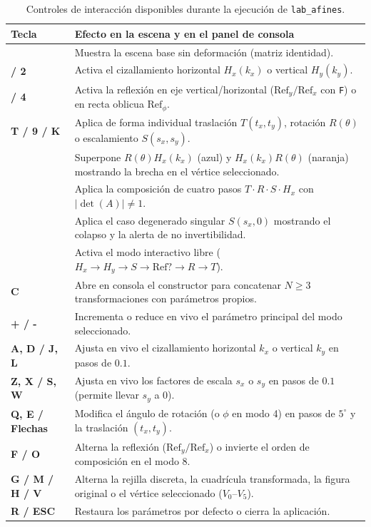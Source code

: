 \documentclass[a4paper,10pt]{article}
\begin{document}
\begin{table}[H]
\caption{Controles de interacción disponibles durante la ejecución de \texttt{lab\_afines}.}
\label{tab:controles}
\centering
\small
\renewcommand{\arraystretch}{1.15}
\begin{tabularx}{\textwidth}{>{\bfseries\ttfamily}p{2.6cm} X}
\toprule
Tecla & Efecto en la escena y en el panel de consola \\
\midrule
0 & Muestra la escena base sin deformación (matriz identidad). \\
1 / 2 & Activa el cizallamiento horizontal $H_x(k_x)$ o vertical $H_y(k_y)$. \\
3 / 4 & Activa la reflexión en eje vertical/horizontal ($\mathrm{Ref}_y/\mathrm{Ref}_x$ con \texttt{F}) o en recta oblicua $\mathrm{Ref}_\phi$. \\
T / 9 / K & Aplica de forma individual traslación $T(t_x,t_y)$, rotación $R(\theta)$ o escalamiento $S(s_x,s_y)$. \\
5 & Superpone $R(\theta)H_x(k_x)$ (azul) y $H_x(k_x)R(\theta)$ (naranja) mostrando la brecha en el vértice seleccionado. \\
6 & Aplica la composición de cuatro pasos $T\cdot R\cdot S\cdot H_x$ con $|\det(A)| \neq 1$. \\
7 & Aplica el caso degenerado singular $S(s_x, 0)$ mostrando el colapso y la alerta de no invertibilidad. \\
8 & Activa el modo interactivo libre ($H_x \to H_y \to S \to \mathrm{Ref}? \to R \to T$). \\
C & Abre en consola el constructor para concatenar $N \ge 3$ transformaciones con parámetros propios. \\
+ / - & Incrementa o reduce en vivo el parámetro principal del modo seleccionado. \\
A, D / J, L & Ajusta en vivo el cizallamiento horizontal $k_x$ o vertical $k_y$ en pasos de $0.1$. \\
Z, X / S, W & Ajusta en vivo los factores de escala $s_x$ o $s_y$ en pasos de $0.1$ (permite llevar $s_y$ a $0$). \\
Q, E / Flechas & Modifica el ángulo de rotación (o $\phi$ en modo 4) en pasos de $5^\circ$ y la traslación $(t_x, t_y)$. \\
F / O & Alterna la reflexión ($\mathrm{Ref}_y/\mathrm{Ref}_x$) o invierte el orden de composición en el modo 8. \\
G / M / H / V & Alterna la rejilla discreta, la cuadrícula transformada, la figura original o el vértice seleccionado ($V_0$--$V_5$). \\
R / ESC & Restaura los parámetros por defecto o cierra la aplicación. \\
\bottomrule
\end{tabularx}
\end{table}
\end{document}
